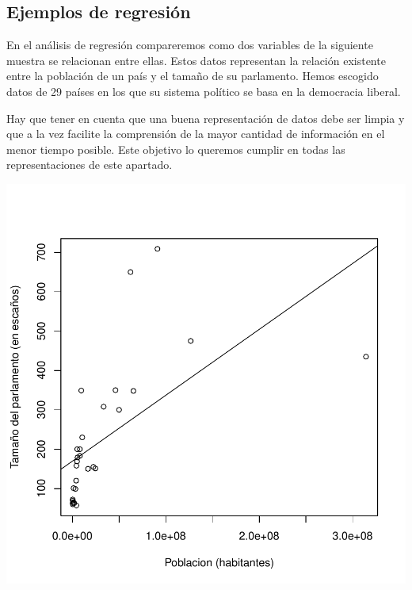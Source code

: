\documentclass [a4paper] {article}
\begin{document}
\subsection{Ejemplos de regresión}
En el análisis de regresión compareremos como dos variables de la siguiente muestra se relacionan entre ellas.
Estos datos representan la relación existente entre la población de un país y el tamaño de su parlamento. 
Hemos escogido datos de 29 países en los que su sistema político se basa en la democracia liberal.

Hay que tener en cuenta que una buena representación de datos debe ser limpia y que a la vez facilite la comprensión de la mayor cantidad de información en el menor tiempo posible. 
Este objetivo lo queremos cumplir en todas las representaciones de este apartado.

\begin{center}
\includegraphics{entrega-plot_democracia}
\end{center}
\end{document}
